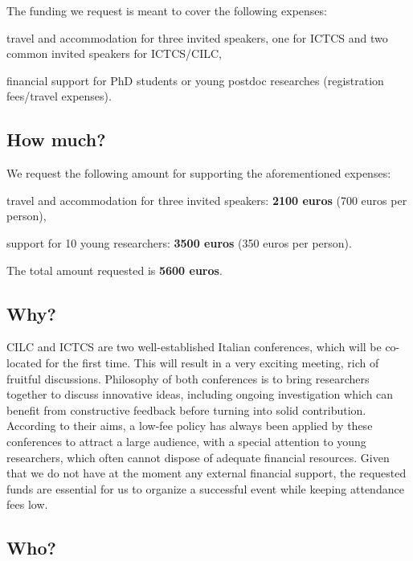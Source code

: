 \documentclass[12pt]{article}
\begin{document}
\begin{spacing}{1}
The funding we request is meant to cover the following expenses:

\begin{compactenum}[$(i)$]
\item travel and accommodation for three invited speakers, one for
  ICTCS and two common invited speakers for ICTCS/CILC,
\item financial support for PhD students or young postdoc researches
  (registration fees/travel expenses).
\end{compactenum}

\subsection*{How much?}
We request the following amount for supporting the aforementioned expenses:
\begin{compactenum}[$(i)$]
\item travel and accommodation for three invited speakers: \textbf{2100 euros}
  (700 euros per person),
\item support for 10 young researchers: \textbf{3500 euros} (350 euros per
  person).
\end{compactenum}
The total amount requested is \textbf{5600 euros}.

\subsection*{Why?}

CILC and ICTCS are two well-established Italian conferences, which will be
co-located for the first time.
This will result in a very exciting meeting, rich of fruitful discussions.
Philosophy of both conferences is to bring researchers together to discuss
innovative ideas, including ongoing investigation which can benefit from
constructive feedback before turning into solid contribution.
According to their aims, a low-fee policy has always been applied by these
conferences to attract a large audience, with a special attention to
young researchers, which often cannot dispose of adequate financial resources.
Given that we do not have at the moment any external financial support, the
requested funds are essential for us to organize a successful event while
keeping attendance fees low.

\subsection*{Who?}


\end{spacing}
\end{document}
